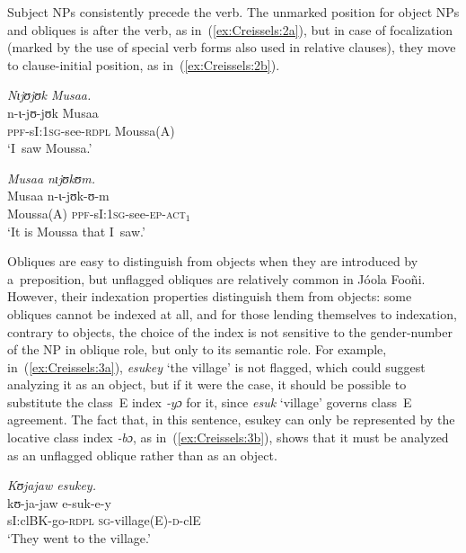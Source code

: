 \documentclass[output=paper]{langscibook}
\begin{document}
  \z
\z

Subject NPs consistently precede the verb.  The unmarked position for object
NPs and obliques is after the verb, as in~(\ref{ex:Creissels:2a}), but in case of
focalization (marked by the use of special verb forms also used in relative
clauses), they move to clause-initial position, as in~(\ref{ex:Creissels:2b}).

\ea
  \label{ex:Creissels:2}
  
    \ea\label{ex:Creissels:2a}
    
      \textit{Nɩjʊjʊk Musaa.} \\
      \gll n-ɩ-jʊ-jʊk Musaa \\
      \textsc{ppf}-sI:\textsc{1sg}-see-\textsc{rdpl} Moussa(A) \\
      \glt `I~saw Moussa.'


    \ex\label{ex:Creissels:2b}
    
      \textit{Musaa nɩjʊkʊm.}\\
      \gll Musaa n-ɩ-jʊk-ʊ-m\\
      Moussa(A) \textsc{ppf}-sI:\textsc{1sg}-see-\textsc{ep-act$_1$}\\
      \glt `It is Moussa that I~saw.'

  \z
\z

Obliques are easy to distinguish from objects when they are introduced by
a~preposition, but unflagged obliques are relatively common in Jóola Fooñi.
However, their indexation properties distinguish them from objects: some
obliques cannot be indexed at all, and for those lending themselves to
indexation, contrary to objects, the choice of the index is not sensitive to
the gender-number of the NP in oblique role, but only to its semantic role.
For example, in~(\ref{ex:Creissels:3a}), \textit{esukey} `the village' is not flagged,
which could suggest analyzing it as an object, but if it were the case, it
should be possible to substitute the class~E index \textit{‑yɔ} for it, since
\textit{esuk} `village' governs class~E agreement.  The fact that, in this
sentence, esukey can only be represented by the locative class index
\textit{‑bɔ}, as in~(\ref{ex:Creissels:3b}), shows that it must be analyzed as an
unflagged oblique rather than as an object.

\ea
  \label{ex:Creissels:3}
  
    \ea\label{ex:Creissels:3a}
    
      \textit{Kʊjajaw esukey.} \\
      \gll kʊ-ja-jaw e-suk-e-y\\
      sI:clBK-go-\textsc{rdpl} \textsc{sg}-village(E)-\textsc{d}-clE\\
      \glt `They went to the village.'
\end{document}
